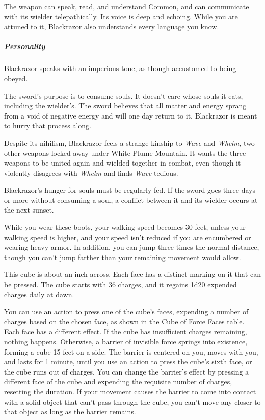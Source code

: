 \documentclass[10pt,a4paper,twoside,bg=print,twocolumn,openany,nodeprecatedcode]{dndbook}
\begin{document}
The weapon can speak, read, and understand Common, and can communicate with its wielder telepathically. Its voice is deep and echoing. While you are attuned to it, Blackrazor also understands every language you know.

\subparagraph{Personality}
Blackrazor speaks with an imperious tone, as though accustomed to being obeyed.

The sword's purpose is to consume souls. It doesn't care whose souls it eats, including the wielder's. The sword believes that all matter and energy sprang from a void of negative energy and will one day return to it. Blackrazor is meant to hurry that process along.

Despite its nihilism, Blackrazor feels a strange kinship to \textit{Wave} and \textit{Whelm}, two other weapons locked away under White Plume Mountain. It wants the three weapons to be united again and wielded together in combat, even though it violently disagrees with \textit{Whelm} and finds \textit{Wave} tedious.

Blackrazor's hunger for souls must be regularly fed. If the sword goes three days or more without consuming a soul, a conflict between it and its wielder occurs at the next sunset.

While you wear these boots, your walking speed becomes 30 feet, unless your walking speed is higher, and your speed isn't reduced if you are encumbered or wearing heavy armor. In addition, you can jump three times the normal distance, though you can't jump farther than your remaining movement would allow.

This cube is about an inch across. Each face has a distinct marking on it that can be pressed. The cube starts with 36 charges, and it regains 1d20 expended charges daily at dawn.

You can use an action to press one of the cube's faces, expending a number of charges based on the chosen face, as shown in the Cube of Force Faces table. Each face has a different effect. If the cube has insufficient charges remaining, nothing happens. Otherwise, a barrier of invisible force springs into existence, forming a cube 15 feet on a side. The barrier is centered on you, moves with you, and lasts for 1 minute, until you use an action to press the cube's sixth face, or the cube runs out of charges. You can change the barrier's effect by pressing a different face of the cube and expending the requisite number of charges, resetting the duration. If your movement causes the barrier to come into contact with a solid object that can't pass through the cube, you can't move any closer to that object as long as the barrier remains.
\end{document}
